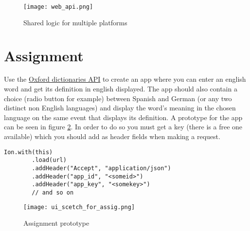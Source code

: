 \begin{figure}[H]
\centering
\texttt{[image: web\_api.png]}
\caption{Shared logic for multiple platforms}
\label{fig:logshare}
\end{figure}

\section{Assignment}
Use the \href{https://developer.oxforddictionaries.com}{Oxford dictionaries API} to create an app where you can enter an english word and get its definition in english displayed. The app should also contain a choice (radio button for example) between Spanish and German (or any two distinct non English languages) and display the word's meaning in the chosen language on the same event that displays its definition. A prototype for the app can be seen in figure \ref{fig:proto}. In order to do so you must get a key (there is a free one available) which you should add as header fields when making a request.
\begin{lstlisting}[style=A_Java]
Ion.with(this)
        .load(url)
        .addHeader("Accept", "application/json")
        .addHeader("app_id", "<someid>")
        .addHeader("app_key", "<somekey>")
        // and so on
\end{lstlisting}
\begin{figure}[H]
\centering
\texttt{[image: ui\_scetch\_for\_assig.png]}
\caption{Assignment prototype}
\label{fig:proto}
\end{figure}